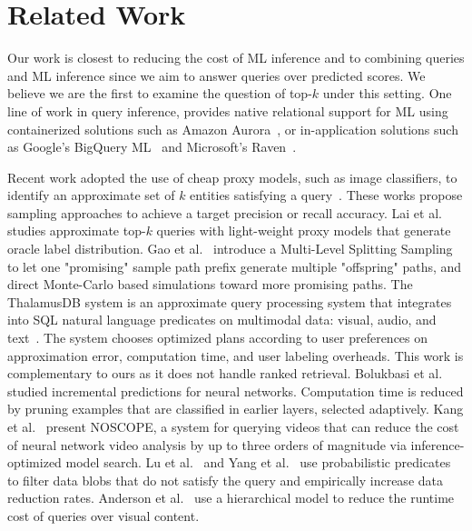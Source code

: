 \section{Related Work}
\label{sec:rel}
Our work is closest to reducing the cost of ML inference and to combining queries and ML inference since we aim to answer queries over predicted scores. We believe we are the first to examine the question of top-$k$ under this setting. 
One line of work in query inference, provides native relational support for ML  using containerized solutions such as Amazon Aurora~\cite{sagemaker_2022}, or in-application solutions such as Google's BigQuery ML~\cite{bigquery_2022} and Microsoft's Raven~\cite{DBLP:conf/cidr/KaranasosIPSPPX20}. 

Recent work adopted the use of cheap proxy models, such as image classifiers, to identify  an  approximate  set of $k$ entities satisfying a query~\cite{DBLP:journals/pvldb/DingAL22,DBLP:journals/pvldb/KangGBHZ20}. These works propose sampling approaches to achieve a target precision or recall accuracy. 
Lai et al.~\cite{10.1145/3448016.3452786} studies approximate top-$k$ queries with light-weight proxy models that generate oracle label distribution.
Gao et al.~\cite{DBLP:conf/sigmod/GaoXAY21} introduce a Multi-Level Splitting Sampling to let one "promising" sample path prefix generate multiple "offspring" paths, and direct Monte-Carlo based simulations toward more promising paths.  The ThalamusDB system is an approximate query processing system that integrates into SQL natural language predicates on multimodal data: visual, audio, and text~\cite{DBLP:journals/pacmmod/JoT24}. The system chooses optimized plans according to user preferences on approximation error, computation time, and user labeling overheads. This work is complementary to ours as it does not handle ranked retrieval.
Bolukbasi et al.~\cite{DBLP:conf/icml/BolukbasiWDS17} studied incremental predictions for neural networks.  
 Computation time is reduced by pruning examples that are classified in earlier layers, selected adaptively. 
Kang et al.~\cite{DBLP:journals/pvldb/KangEABZ17} present NOSCOPE, a system for querying videos that can reduce the cost of neural network video analysis by up to three orders of magnitude via inference-optimized model search.
Lu et al.~\cite{DBLP:conf/sigmod/LuCKC18} and Yang et al.~\cite{10.14778/3547305.3547310} use probabilistic predicates to filter data blobs that do not satisfy the query and empirically increase data reduction rates. 
Anderson et al.~\cite{DBLP:conf/icde/AndersonCRW19} use a hierarchical model to reduce the runtime cost of queries over visual content.